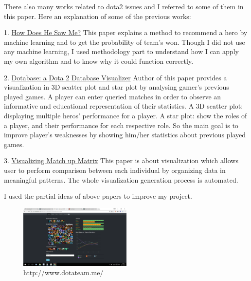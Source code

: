\documentclass[twocolumn]{autart}    %
\begin{document}
There also many works related to dota2 issues and I referred to some of them in this paper. Here an explanation of some of the previous works:

1. \href{http://cs229.stanford.edu/proj2013/PerryConley-HowDoesHeSawMeARecommendationEngineForPickingHeroesInDota2.pdf}{How Does He Saw Me?} This paper explains a method to recommend a hero by machine learning and to get the probability of team's won. Though I did not use any machine learning, I used methodology part to understand how I can apply my own algorithm and to know why it could function correctly.

2. \href{https://classes.soe.ucsc.edu/cmps161/Winter14/projects/athsueh/proj/projectReport.pdf}{Dotabase: a Dota 2 Database Visualizer}
Author of this paper provides a visualization in 3D scatter plot and star plot by analysing gamer's previous played games. A player can enter queried matches in order to observe an informative and 					
educational representation of their statistics. A 3D scatter plot: displaying multiple heros’ performance for a player. A star plot: show the roles of a player, and their performance for each respective role. So the main goal is to improve player's weaknesses by showing him/her statistics about previous played games. 

3. \href{http://web.stanford.edu/class/archive/cs/cs448b/cs448b.1166/cgi-bin/wiki/images/a/ae/Cqiaoben_final.pdf}{Visualizing Match up Matrix}  This paper is about visualization which allows user to perform comparison between each individual by organizing data in meaningful
patterns. The whole visualization generation process is automated.

I used the partial ideas of above papers to improve my project.  

\begin{figure}
  \centering
  
    \includegraphics[width=0.5\textwidth]{dotateam.png}
\caption{http://www.dotateam.me/}
 \label{dotateam}
 
\end{figure}
\end{document}
